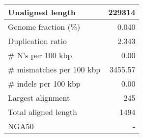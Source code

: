 \documentclass[12pt,a4paper]{article}
\begin{document}
\begin{table}[ht]
\begin{center}
\begin{tabular}{|l*{1}{|r}|}
Unaligned length & 229314 \\ \hline
Genome fraction (\%) & 0.040 \\ \hline
Duplication ratio & 2.343 \\ \hline
\# N's per 100 kbp & 0.00 \\ \hline
\# mismatches per 100 kbp & 3455.57 \\ \hline
\# indels per 100 kbp & 0.00 \\ \hline
Largest alignment & 245 \\ \hline
Total aligned length & 1494 \\ \hline
NGA50 & - \\ \hline
\end{tabular}
\end{center}
\end{table}
\end{document}
